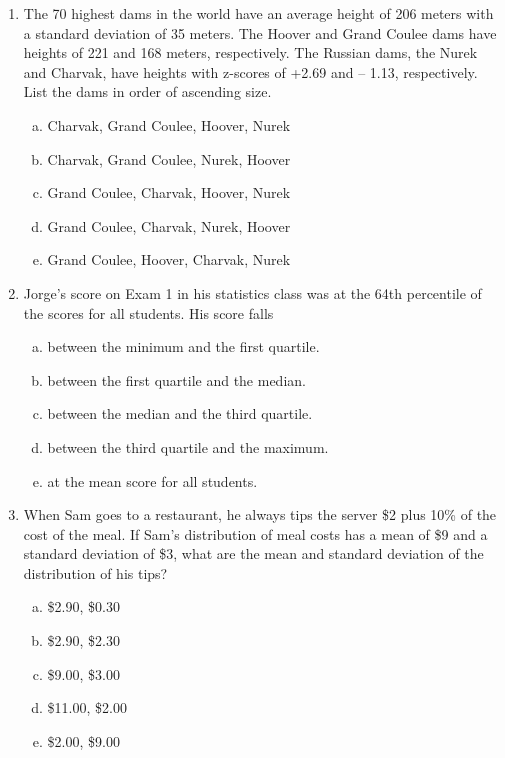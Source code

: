 \documentclass[a4paper,12pt,twoside]{book}
\begin{document}
\begin{itemize}
\begin{enumerate}
    \item The 70 highest dams in the world have an average height of 206 meters with a standard deviation of 35 meters. The Hoover and Grand Coulee dams have heights of 221 and 168 meters, respectively. The Russian dams, the Nurek and Charvak, have heights with z-scores of +2.69 and – 1.13, respectively. List the dams in order of ascending size.
    \begin{enumerate}[(a)]
      \item Charvak, Grand Coulee, Hoover, Nurek
      \item Charvak, Grand Coulee, Nurek, Hoover
      \item Grand Coulee, Charvak, Hoover, Nurek
      \item Grand Coulee, Charvak, Nurek, Hoover
      \item Grand Coulee, Hoover, Charvak, Nurek
    \end{enumerate}
    \vspace{0.3cm}
    
    \item Jorge’s score on Exam 1 in his statistics class was at the 64th percentile of the scores for all students. His score falls
    
    \begin{enumerate}[(a)]
        \item between the minimum and the first quartile.
        \item between the first quartile and the median.
        \item between the median and the third quartile.
        \item between the third quartile and the maximum.
        \item at the mean score for all students.
    \end{enumerate}
    \vspace{0.3cm}
    
    \item When Sam goes to a restaurant, he always tips the server \$2 plus 10\% of the cost of the meal. If Sam’s distribution of meal costs has a mean of \$9 and a standard deviation of \$3, what are the mean and standard deviation of the distribution of his tips?
    
        \begin{enumerate}[(a)]
            \item  \$2.90, \$0.30
            \item  \$2.90, \$2.30
            \item  \$9.00, \$3.00
            \item  \$11.00, \$2.00
            \item  \$2.00, \$9.00
        \end{enumerate}
        \vspace{0.3cm}
        

\end{enumerate}
\end{itemize}
\end{document}
